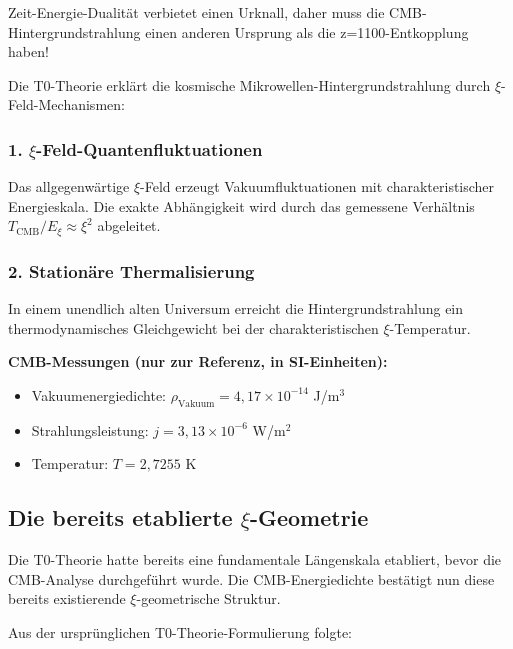 	\begin{revolutionary}
		Zeit-Energie-Dualität verbietet einen Urknall, daher muss die CMB-Hintergrundstrahlung einen anderen Ursprung als die z=1100-Entkopplung haben!
	\end{revolutionary}
	
	Die T0-Theorie erklärt die kosmische Mikrowellen-Hintergrundstrahlung durch $\xi$-Feld-Mechanismen:
	
	\subsubsection{1. $\xi$-Feld-Quantenfluktuationen}
	Das allgegenwärtige $\xi$-Feld erzeugt Vakuumfluktuationen mit charakteristischer Energieskala. Die exakte Abhängigkeit wird durch das gemessene Verhältnis $T_{\text{CMB}}/E_\xi \approx \xi^2$ abgeleitet.
	
	\subsubsection{2. Stationäre Thermalisierung}
	In einem unendlich alten Universum erreicht die Hintergrundstrahlung ein thermodynamisches Gleichgewicht bei der charakteristischen $\xi$-Temperatur.
	
	\begin{sibox}
		\textbf{CMB-Messungen (nur zur Referenz, in SI-Einheiten):}
		\begin{itemize}
			\item Vakuumenergiedichte: $\rho_{\text{Vakuum}} = 4,17 \times 10^{-14}$ J/m$^3$
			\item Strahlungsleistung: $j = 3,13 \times 10^{-6}$ W/m$^2$
			\item Temperatur: $T = 2,7255$ K
		\end{itemize}
	\end{sibox}
	
	\subsection{Die bereits etablierte $\xi$-Geometrie}
	
	\begin{important}
		Die T0-Theorie hatte bereits eine fundamentale Längenskala etabliert, bevor die CMB-Analyse durchgeführt wurde. Die CMB-Energiedichte bestätigt nun diese bereits existierende $\xi$-geometrische Struktur.
	\end{important}
	
	Aus der ursprünglichen T0-Theorie-Formulierung folgte:
	
